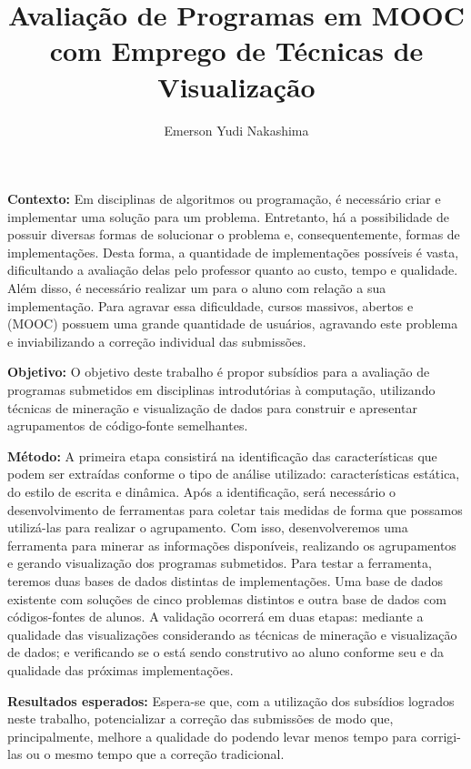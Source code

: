 \documentclass[12pt,english,brazil,a4paper,utf8,oneside]{utfpr-tcc}
\author{Emerson Yudi Nakashima}  %
\title{Avaliação de Programas em MOOC com Emprego de Técnicas de Visualização} %
\begin{document}
	
\frontmatter
\maketitle

\begin{resumo}
\textbf{Contexto:} Em disciplinas de algoritmos ou programação, é necessário criar
e implementar uma solução para um problema. Entretanto, há a possibilidade de possuir
diversas formas de solucionar o problema e, consequentemente, formas de implementações.
Desta forma, a quantidade de implementações possíveis é vasta, dificultando a avaliação
delas pelo professor quanto ao custo, tempo e qualidade. Além disso, é necessário realizar
um  para o aluno com relação a sua implementação. Para agravar essa
dificuldade, cursos massivos, abertos e  (MOOC) possuem uma grande
quantidade de usuários, agravando este problema e inviabilizando a correção individual
das submissões.

\textbf{Objetivo:} O objetivo deste trabalho é propor subsídios para a avaliação de
programas submetidos em disciplinas introdutórias à computação, utilizando técnicas
de mineração e visualização de dados para construir e apresentar agrupamentos de
código-fonte semelhantes.

\textbf{Método:} A primeira etapa consistirá na identificação das características que
podem ser extraídas conforme o tipo de análise utilizado: características estática, do
estilo de escrita e dinâmica. Após a identificação, será necessário o desenvolvimento
de ferramentas para coletar tais medidas de forma que possamos utilizá-las para realizar
o agrupamento. Com isso, desenvolveremos uma ferramenta para minerar as informações
disponíveis, realizando os agrupamentos e gerando visualização dos programas submetidos.
Para testar a ferramenta, teremos duas bases de dados distintas de implementações. Uma
base de dados existente com soluções de cinco problemas distintos e outra base de dados
com códigos-fontes de alunos. A validação ocorrerá em duas etapas: mediante a qualidade
das visualizações considerando as técnicas de mineração e visualização de dados; e
verificando se o  está sendo construtivo ao aluno conforme seu
 e da qualidade das próximas implementações.

\textbf{Resultados esperados:} Espera-se que, com a utilização dos subsídios logrados
neste trabalho, potencializar a correção das submissões de modo que, principalmente,
melhore a qualidade do  podendo levar menos tempo para corrigi-las
ou o mesmo tempo que a correção tradicional.


\end{resumo}
\end{document}
